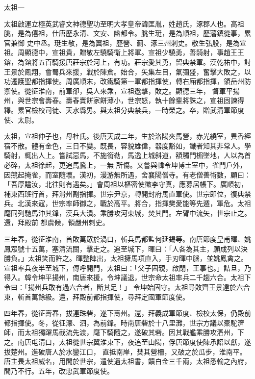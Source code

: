 
\begin{pinyinscope}

 太祖一



 太祖啟運立極英武睿文神德聖功至明大孝皇帝諱匡胤，姓趙氏，涿郡人也。高祖朓，是為僖祖，仕唐歷永清、文安、幽都令。朓生珽，是為順祖，歷藩鎮從事，累官兼御
 史中丞。珽生敬，是為翼祖，歷營、薊、涿三州刺史。敬生弘殷，是為宣祖。周顯德中，宣祖貴，贈敬左驍騎衛上將軍。宣祖少驍勇，善騎射，事趙王王鎔，為鎔將五百騎援唐莊宗於河上，有功。莊宗愛其勇，留典禁軍。漢乾祐中，討王景於鳳翔，會蜀兵來援，戰於陳倉。始合，矢集左目，氣彌盛，奮擊大敗之，以功遷護聖都指揮使。周廣順末，改鐵騎第一軍都指揮使，轉右廂都指揮，領岳州防禦使。從征淮南，前軍卻，吳人來乘，宣祖邀擊，敗之。顯德三年，
 督軍平揚州，與世宗會壽春。壽春賣餅家餅薄小，世宗怒，執十餘輩將誅之，宣祖固諫得釋。累官檢校司徒、天水縣男。與太祖分典禁兵，一時榮之。卒，贈武清軍節度使、太尉。



 太祖，宣祖仲子也，母杜氏。後唐天成二年，生於洛陽夾馬營，赤光繞室，異香經宿不散。體有金色，三日不變。既長，容貌雄偉，器度豁如，識者知其非常人。學騎射，輒出人上。嘗試惡馬，不施銜勒，馬逸上城斜道，額觸門楣墜地，人以為首必碎，太祖徐起，更追馬騰上，一無
 所傷。又嘗與韓令坤博土室中，雀鬥戶外，因競起掩雀，而室隨壞。漢初，漫游無所遇，舍襄陽僧寺。有老僧善術數，顧曰：「吾厚贐汝，北往則有遇矣。」會周祖以樞密使徵李守真，應募居帳下。廣順初，補東西班行首，拜滑州副指揮。世宗尹京，轉開封府馬直軍使。世宗即位，復典禁兵。北漢來寇，世宗率師御之，戰於高平。將合，指揮樊愛能等先遁，軍危。太祖麾同列馳馬沖其鋒，漢兵大潰。乘勝攻河東城，焚其門。左臂中流矢，世宗止之。還，拜殿前
 都虞候，領嚴州刺史。



 三年春，從征淮南，首敗萬眾於渦口，斬兵馬都監何延錫等。南唐節度皇甫暉、姚鳳眾號十五萬，塞清流關，擊走之。追至城下，暉曰：「人各為其主，願成列以決勝負。」太祖笑而許之。暉整陣出，太祖擁馬項直入，手刃暉中腦，並姚鳳禽之。宣祖率兵夜半至城下，傳呼開門，太祖曰：「父子固親，啟閉，王事也。」詰旦，乃得入。韓令坤平揚州，南唐來援，令坤議退，世宗命太祖率兵二千趨六合。太祖下令曰：「揚州兵敢有過六合者，斷其足！」
 令坤始固守。太祖尋敗齊王景達於六合東，斬首萬餘級。還，拜殿前都指揮使，尋拜定國軍節度使。



 四年春，從征壽春，拔連珠砦，遂下壽州。還，拜義成軍節度、檢校太保，仍殿前都指揮使。冬，從征濠、泗，為前鋒。時南唐砦於十八里灘，世宗方議以橐駝濟師，而太祖獨躍馬截流先渡，麾下騎隨之，遂破其砦。因其戰艦乘勝攻泗州，下之。南唐屯清口，太祖從世宗翼淮東下，夜追至山陽，俘唐節度使陳承詔以獻，遂拔楚州。進破唐人於水鑾江口，
 直抵南岸，焚其營柵，又破之於瓜步，淮南平。唐主畏太祖威名，用間於世宗，遣使遺太祖書，饋白金三千兩，太祖悉輸之內府，間乃不行。五年，改忠武軍節度使。




\end{pinyinscope}
